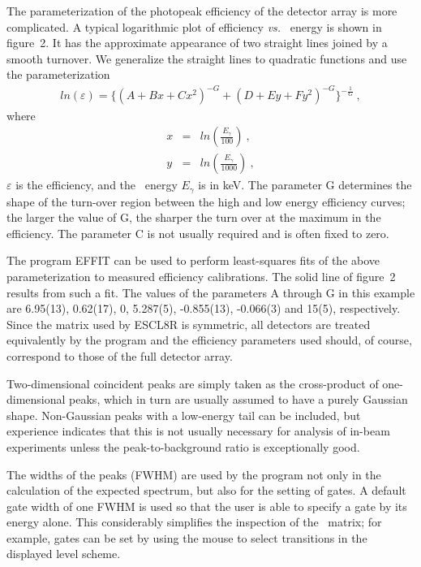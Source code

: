 The parameterization of the photopeak efficiency of the detector array is more
complicated. A typical logarithmic plot of efficiency {\em vs.} \ghray\ energy
is shown in figure~2. It has the approximate appearance of two straight lines
joined by a smooth turnover. We generalize the straight lines to quadratic
functions and use the parameterization
\begin{eqnarray}
 ln (\varepsilon) = \{(A+Bx+Cx^2)^{-G} + (D+Ey+Fy^2)^{-G}\}^{-\frac{1}{G}} \ ,
\end{eqnarray}
where 
\begin{eqnarray}
x & = & ln \left ( \frac{E_\gamma}{100} \right ) \ , \\
y & = & ln \left ( \frac{E_\gamma}{1000} \right ) \ ,
\end{eqnarray}
$\varepsilon$ is the efficiency, and the \ghray\ energy $E_\gamma$ is in keV.
The parameter G determines the shape of the turn-over region between the high
and low energy efficiency curves; the larger the value of G, the sharper the
turn over at the maximum in the efficiency.
The parameter C is not usually required and is often fixed to zero. 

The program EFFIT can be used to perform least-squares fits of the above
parameterization to measured efficiency calibrations. The solid line of
figure~2 results from such a fit. The values of the parameters A through G in
this example are 6.95(13), 0.62(17), 0, 5.287(5), -0.855(13), -0.066(3) and
15(5), respectively. Since the matrix used by ESCL8R is symmetric, all
detectors are treated equivalently by the program and the efficiency parameters
used should, of course, correspond to those of the full detector array.

Two-dimensional coincident peaks are simply taken as the cross-product of
one-dimen\-sional peaks, which in turn are usually assumed to have a purely
Gaussian shape. Non-Gaussian peaks with a low-energy tail can be included, but
experience indicates that this is not usually necessary for analysis of in-beam
experiments unless the peak-to-background ratio is exceptionally good.

The widths of the peaks (FWHM) are used by the program not only in the
calculation of the expected spectrum, but also for the setting of gates. A
default gate width of one FWHM is used so that the user is able to specify a
gate by its energy alone. This considerably simplifies the inspection of the
\ghg\ matrix; for example, gates can be set by using the mouse to select
transitions in the displayed level scheme.

